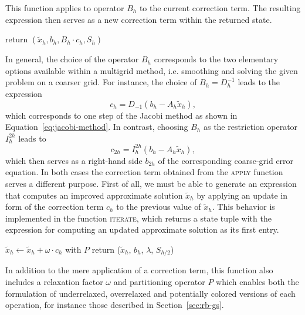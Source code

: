 This function applies to operator $B_h$ to the current correction term. 
The resulting expression then serves as a new correction term within the returned state.
\begin{algorithm}
	\begin{algorithmic}
		\State return $(\tilde{x}_h, b_h, B_h\cdot c_h, S_h)$
		\EndFunction
	\end{algorithmic}
\end{algorithm}
In general, the choice of the operator $B_h$ corresponds to the two elementary options available within a multigrid method, i.e. smoothing and solving the given problem on a coarser grid.
For instance, the choice of $B_h = D_h^{-1}$ leads to the expression
\begin{equation*}
	c_h = D_{-1} (b_h - A_h \tilde{x}_h),
\end{equation*}
which corresponds to one step of the Jacobi method as shown in Equation~\ref{eq:jacobi-method}.
In contrast, choosing $B_h$ as the restriction operator $I_h^{2h}$ leads to
\begin{equation*}
	c_{2h} = I_{h}^{2h} (b_h - A_h \tilde{x}_h),
\end{equation*}
which then serves as a right-hand side $b_{2h}$ of the corresponding coarse-grid error equation.
In both cases the correction term obtained from the \textsc{apply} function serves a different purpose.
First of all, we must be able to generate an expression that computes an improved approximate solution $\tilde{x}_h$ by applying an update in form of the correction term $c_h$ to the previous value of $\tilde{x}_h$. 
This behavior is implemented in the function \textsc{iterate}, which returns a state tuple with the expression for computing an updated approximate solution as its first entry.
\begin{algorithm}
	\begin{algorithmic}
		\Function{iterate}{$\omega$, $P$, ($\tilde{x}_h$, $b_h$, $c_h$, $S_{h/2}$)}
			\State $\tilde{x}_h \gets \tilde{x}_h + \omega \cdot c_h$ with $P$
			\State return ($\tilde{x}_h$, $b_h$, $\lambda$, $S_{h/2}$) 
		\EndFunction
	\end{algorithmic}
\end{algorithm}
In addition to the mere application of a correction term, this function also includes a relaxation factor $\omega$ and partitioning operator $P$ which enables both the formulation of underrelaxed, overrelaxed and potentially colored versions of each operation, for instance those described in Section~\ref{sec:rb-gs}.
